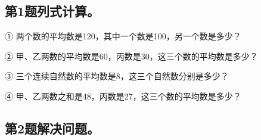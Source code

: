 \subsection*{第1题\quad 列式计算。}
\noindent ① 两个数的平均数是120，其中一个数是100，另一个数是多少？\par
{}
\noindent ② 甲、乙两数的平均数是60，丙数是30，这三个数的平均数是多少？\par
{}
\noindent ③ 三个连续自然数的平均数是8，这三个自然数分别是多少？\par
{}
\noindent ④ 甲、乙两数之和是48，丙数是27，这三个数的平均数是多少？\par
{}
\subsection*{第2题\quad 解决问题。}
